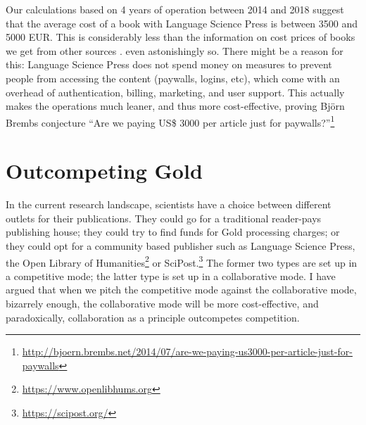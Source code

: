 \documentclass[12pt]{article}
\newcommand\wordcount{}
\begin{document}
Our calculations based on 4 years of operation between 2014 and 2018 suggest that the average cost of a book with Language Science Press is between 3500 and 5000 EUR. This is considerably less than the information on cost prices of books we get from other sources \citep{MaronEtAl2016,FerwerdaEtAl2018}.
even astonishingly so. There might be a reason for this: Language Science Press does not spend money on measures to prevent people from accessing the content (paywalls, logins, etc), which come with an overhead of authentication, billing, marketing, and user support. This actually makes the operations much leaner, and thus more cost-effective, proving Björn Brembs conjecture ``Are we paying US\$ 3000 per article just for paywalls?''\footnote{\url{http://bjoern.brembs.net/2014/07/are-we-paying-us3000-per-article-just-for-paywalls}}

 
\section{Outcompeting Gold}            
In the current research landscape, scientists have a choice between different outlets for their publications. They could go for a traditional reader-pays publishing house; they could try to find funds for Gold processing charges; or they could opt for a community based publisher such as Language Science Press, the Open Library of Humanities\footnote{\url{https://www.openlibhums.org}} or SciPost.\footnote{\url{https://scipost.org/}}  The former two types are set up in a competitive mode; the latter type is set up in a collaborative mode. I have argued that when we pitch the competitive mode against the collaborative mode, bizarrely enough, the collaborative mode will be more cost-effective, and paradoxically, collaboration as a principle outcompetes competition. 
 
\wordcount

\sloppy
\printbibliography
\end{document}
